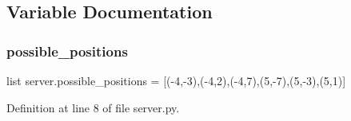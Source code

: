 \subsection{Variable Documentation}
\mbox{\label{namespaceserver_a44225ce840223e3bbc4ec0e8cd921add}} 
\subsubsection{\texorpdfstring{possible\+\_\+positions}{possible\_positions}}
{\footnotesize\ttfamily list server.\+possible\+\_\+positions = \mbox{[}(-\/4,-\/3),(-\/4,2),(-\/4,7),(5,-\/7),(5,-\/3),(5,1)\mbox{]}}



Definition at line 8 of file server.\+py.

